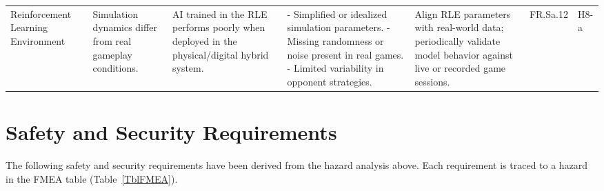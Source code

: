 \documentclass{article}
\begin{document}
\begin{landscape}
\begin{tabularx}{\linewidth}{|P{2.3cm}|Y|Y|Y|Y|P{1.4cm}|P{0.8cm}|}
        \hline

        Reinforcement Learning Environment &
        Simulation dynamics differ from real gameplay conditions. &
        AI trained in the RLE performs poorly when deployed in the physical/digital hybrid system. &
        - Simplified or idealized simulation parameters. \newline - Missing randomness or noise present in real games. \newline - Limited variability in opponent strategies. &
        Align RLE parameters with real-world data; periodically validate model behavior against live or recorded game sessions. &
        FR.Sa.12 &
        H8-a \\
    \end{tabularx}
\end{landscape}

\section{Safety and Security Requirements}\label{sec:safety-and-security-requirements}


The following safety and security requirements have been derived from the hazard analysis above.
Each requirement is traced to a hazard in the FMEA table (Table~\ref{TblFMEA}). \newline
\end{document}
